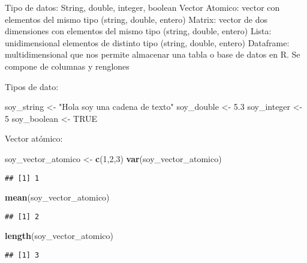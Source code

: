 \documentclass[]{book}
\newenvironment{Shaded}{\begin{snugshade}}{\end{snugshade}}
\newcommand{\DecValTok}[1]{\textcolor[rgb]{0.00,0.00,0.81}{#1}}
\newcommand{\FloatTok}[1]{\textcolor[rgb]{0.00,0.00,0.81}{#1}}
\newcommand{\KeywordTok}[1]{\textcolor[rgb]{0.13,0.29,0.53}{\textbf{#1}}}
\newcommand{\NormalTok}[1]{#1}
\newcommand{\OtherTok}[1]{\textcolor[rgb]{0.56,0.35,0.01}{#1}}
\newcommand{\StringTok}[1]{\textcolor[rgb]{0.31,0.60,0.02}{#1}}
\begin{document}
Tipo de datos: String, double, integer, boolean
Vector Atomico: vector con elementos del mismo tipo (string, double, entero)
Matrix: vector de dos dimensiones con elementos del mismo tipo (string, double, entero)
Lista: unidimensional elementos de distinto tipo (string, double, entero)
Dataframe: multidimensional que nos permite almacenar una tabla o base de datos en R. Se compone de columnas y renglones

Tipos de dato:

\begin{Shaded}
\begin{Highlighting}[]
\NormalTok{soy_string <-}\StringTok{ "Hola soy una cadena de texto"}
\NormalTok{soy_double <-}\StringTok{ }\FloatTok{5.3}
\NormalTok{soy_integer <-}\StringTok{ }\DecValTok{5}
\NormalTok{soy_boolean <-}\StringTok{ }\OtherTok{TRUE}
\end{Highlighting}
\end{Shaded}

Vector atómico:

\begin{Shaded}
\begin{Highlighting}[]
\NormalTok{soy_vector_atomico <-}\StringTok{ }\KeywordTok{c}\NormalTok{(}\DecValTok{1}\NormalTok{,}\DecValTok{2}\NormalTok{,}\DecValTok{3}\NormalTok{)  }
\KeywordTok{var}\NormalTok{(soy_vector_atomico)}
\end{Highlighting}
\end{Shaded}

\begin{verbatim}
## [1] 1
\end{verbatim}

\begin{Shaded}
\begin{Highlighting}[]
\KeywordTok{mean}\NormalTok{(soy_vector_atomico)}
\end{Highlighting}
\end{Shaded}

\begin{verbatim}
## [1] 2
\end{verbatim}

\begin{Shaded}
\begin{Highlighting}[]
\KeywordTok{length}\NormalTok{(soy_vector_atomico)}
\end{Highlighting}
\end{Shaded}

\begin{verbatim}
## [1] 3
\end{verbatim}
\end{document}
